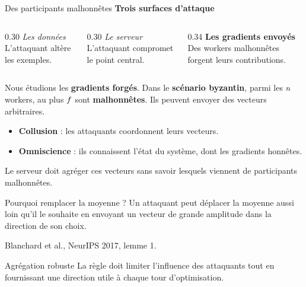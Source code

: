 \begin{frame}{Des participants malhonnêtes}
    \textbf{Trois surfaces d'attaque}

    \begin{columns}[T]
        \begin{column}{0.30\textwidth}
            \textit{Les données}\\
            L'attaquant altère les exemples.
        \end{column}
        \begin{column}{0.30\textwidth}
            \textit{Le serveur}\\
            L'attaquant compromet le point central.
        \end{column}
        \begin{column}{0.34\textwidth}
            \textbf{Les gradients envoyés}\\
            Des workers malhonnêtes forgent leurs contributions.
        \end{column}
    \end{columns}

    \medskip
    Nous étudions les \textbf{gradients forgés}.
    Dans le \textbf{scénario byzantin}, parmi les $n$ workers,
    au plus $f$ sont \textbf{malhonnêtes}.
    Ils peuvent envoyer des vecteurs arbitraires.

    \begin{itemize}
        \item \textbf{Collusion} : les attaquants coordonnent leurs vecteurs.
        \item \textbf{Omniscience} : ils connaissent l'état du système,
            dont les gradients honnêtes.
    \end{itemize}

    Le serveur doit agréger ces vecteurs sans savoir lesquels viennent de
    participants malhonnêtes.
\end{frame}

\begin{frame}{Pourquoi remplacer la moyenne ?}
    Un attaquant peut déplacer la moyenne aussi loin qu'il le souhaite en
    envoyant un vecteur de grande amplitude dans la direction de son choix.

    Blanchard et al., NeurIPS 2017, lemme 1.

    \begin{block}{Agrégation robuste}
        La règle doit limiter l'influence des attaquants tout en fournissant
        une direction utile à chaque tour d'optimisation.
    \end{block}
\end{frame}
